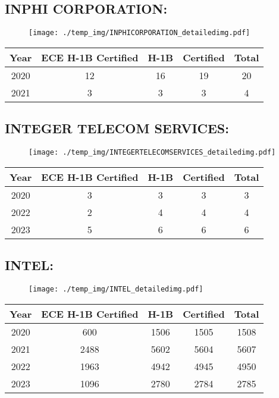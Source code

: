 \documentclass{article}%
\begin{document}
%
\newpage%
\subsection{INPHI CORPORATION:}%
\label{subsec:INPHICORPORATION}%
\label{INPHICORPORATIONdetailed}%


\begin{figure}[htbp]%
\centering%
\texttt{[image: ./temp\_img/INPHICORPORATION\_detailedimg.pdf]}%
\end{figure}

%
\begin{longtable}{c|c|c|c|c}%
\hline%
Year&ECE H{-}1B Certified&H{-}1B&Certified&Total\\%
\hline%
2020&12&16&19&20\\%
\hline%
2021&3&3&3&4\\%
\hline%
\end{longtable}

%
\newpage%
\subsection{INTEGER TELECOM SERVICES:}%
\label{subsec:INTEGERTELECOMSERVICES}%
\label{INTEGERTELECOMSERVICESdetailed}%


\begin{figure}[htbp]%
\centering%
\texttt{[image: ./temp\_img/INTEGERTELECOMSERVICES\_detailedimg.pdf]}%
\end{figure}

%
\begin{longtable}{c|c|c|c|c}%
\hline%
Year&ECE H{-}1B Certified&H{-}1B&Certified&Total\\%
\hline%
2020&3&3&3&3\\%
\hline%
2022&2&4&4&4\\%
\hline%
2023&5&6&6&6\\%
\hline%
\end{longtable}

%
\newpage%
\subsection{INTEL:}%
\label{subsec:INTEL}%
\label{INTELdetailed}%


\begin{figure}[htbp]%
\centering%
\texttt{[image: ./temp\_img/INTEL\_detailedimg.pdf]}%
\end{figure}

%
\begin{longtable}{c|c|c|c|c}%
\hline%
Year&ECE H{-}1B Certified&H{-}1B&Certified&Total\\%
\hline%
2020&600&1506&1505&1508\\%
\hline%
2021&2488&5602&5604&5607\\%
\hline%
2022&1963&4942&4945&4950\\%
\hline%
2023&1096&2780&2784&2785\\%
\hline%
\end{longtable}
\end{document}
